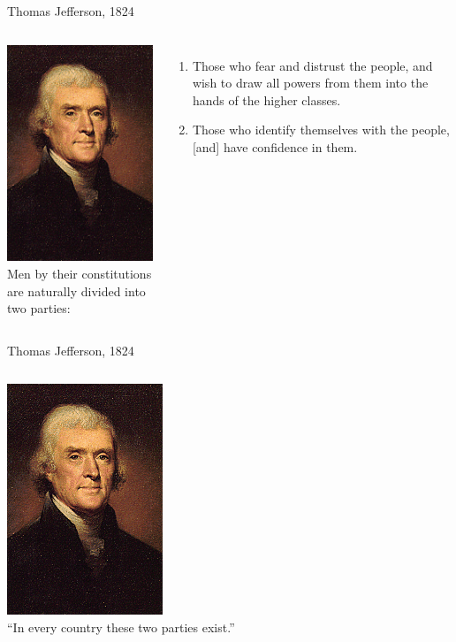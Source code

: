 \begin{frame}{Thomas Jefferson, 1824}
    \begin{columns}[onlytextwidth]
            \centering
            \includegraphics[height=0.75\textheight]{img/jefferson.png} \\

            Men by their constitutions are naturally divided into two parties: \\
            \begin{enumerate}
                \item Those who fear and distrust the people, and wish to draw all powers from them into the hands of the higher classes.
                \item Those who identify themselves with the people, [and] have confidence in them.
            \end{enumerate}
    \end{columns}
\end{frame}

\begin{frame}{Thomas Jefferson, 1824}
    \begin{columns}[onlytextwidth]
            \centering
            \includegraphics[height=0.75\textheight]{img/jefferson.png} \\

            ``In every country these two parties exist.''
    \end{columns}
\end{frame}

